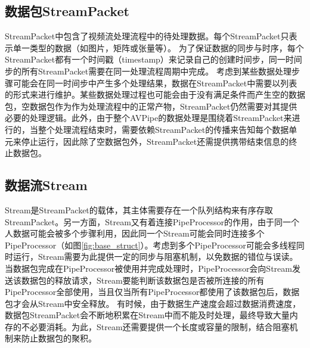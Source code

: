 \subsection{数据包StreamPacket}
StreamPacket中包含了视频流处理流程中的待处理数据。每个StreamPacket只表示单一类型的数据（如图片，矩阵或张量等）。
为了保证数据的同步与时序，每个StreamPacket都有一个时间戳（timestamp）来记录自己的创建时间步，同一时间步的所有StreamPacket需要在同一处理流程周期中完成。
考虑到某些数据处理步骤可能会在同一时间步中产生多个处理结果，数据在StreamPacket中需要以列表的形式来进行维护。某些数据处理过程也可能会由于没有满足条件而产生空的数据包，空数据包作为作为处理流程中的正常产物，StreamPacket仍然需要对其提供必要的处理逻辑。此外，由于整个AVPipe的数据处理是围绕着StreamPacket来进行的，当整个处理流程结束时，需要依赖StreamPacket的传播来告知每个数据单元来停止运行，因此除了空数据包外，StreamPacket还需提供携带结束信息的终止数据包。
\subsection{数据流Stream}\label{ch4:design_stream}
Stream是StreamPacket的载体，其主体需要存在一个队列结构来有序存取StreamPacket。另一方面，Stream又有着连接PipeProcessor的作用，由于同一个人数据可能会被多个步骤利用，因此同一个Stream可能会同时连接多个PipeProcessor（如图\ref{fig:base_struct}）。考虑到多个PipeProcessor可能会多线程同时运行，Stream需要为此提供一定的同步与阻塞机制，以免数据的错位与误读。
当数据包完成在PipeProcessor被使用并完成处理时，PipeProcessor会向Stream发送该数据包的释放请求，Stream要能判断该数据包是否被所连接的所有PipeProcessor全部使用，当且仅当所有PipeProcessor都使用了该数据包后，数据包才会从Stream中安全释放。
有时候，由于数据生产速度会超过数据消费速度，数据包StreamPacket会不断地积累在Stream中而不能及时处理，最终导致大量内存的不必要消耗。为此，Stream还需要提供一个长度或容量的限制，结合阻塞机制来防止数据包的聚积。

